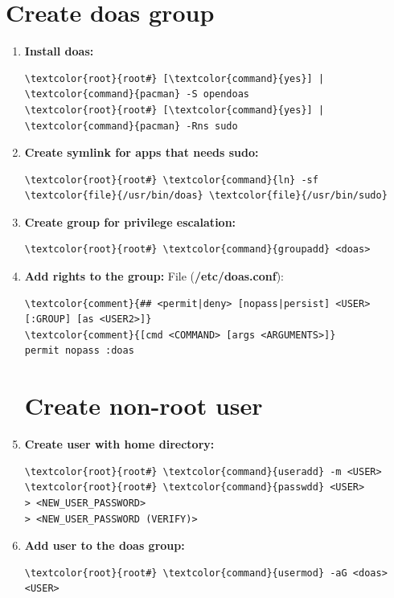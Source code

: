 \documentclass[10pt, a4paper, onecolumn, oneside, titlepage, openany]{book}
\begin{document}
\section{Create doas group}
\begin{enumerate}
    \item \textbf{Install doas:}
\begin{Verbatim}[commandchars=\\\{\}]
\textcolor{root}{root#} [\textcolor{command}{yes}] | \textcolor{command}{pacman} -S opendoas
\textcolor{root}{root#} [\textcolor{command}{yes}] | \textcolor{command}{pacman} -Rns sudo
\end{Verbatim}
    \item \textbf{Create symlink for apps that needs sudo:}
\begin{Verbatim}[commandchars=\\\{\}]
\textcolor{root}{root#} \textcolor{command}{ln} -sf \textcolor{file}{/usr/bin/doas} \textcolor{file}{/usr/bin/sudo}
\end{Verbatim}
    \item \textbf{Create group for privilege escalation:}
\begin{Verbatim}[commandchars=\\\{\}]
\textcolor{root}{root#} \textcolor{command}{groupadd} <doas>
\end{Verbatim}
    \item \textbf{Add rights to the group:}
\newline File (\textbf{\textcolor{file}{/etc/doas.conf}}):
\begin{Verbatim}[commandchars=\\\{\}]
\textcolor{comment}{## <permit|deny> [nopass|persist] <USER>[:GROUP] [as <USER2>]}
\textcolor{comment}{[cmd <COMMAND> [args <ARGUMENTS>]}
permit nopass :doas
\end{Verbatim}

\section{Create non-root user}
    \item \textbf{Create user with home directory:}
\begin{Verbatim}[commandchars=\\\{\}]
\textcolor{root}{root#} \textcolor{command}{useradd} -m <USER>
\textcolor{root}{root#} \textcolor{command}{passwdd} <USER>
> <NEW_USER_PASSWORD>
> <NEW_USER_PASSWORD (VERIFY)>
\end{Verbatim}
    \item \textbf{Add user to the doas group:}
\begin{Verbatim}[commandchars=\\\{\}]
\textcolor{root}{root#} \textcolor{command}{usermod} -aG <doas> <USER>
\end{Verbatim}
\end{enumerate}
\end{document}
